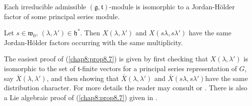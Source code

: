 \setcounter{prop}{5}
\begin{theorem}\label{chap8:thm8.6}
Each irreducible admissible $(\mathfrak{g}, \mathfrak{t})$-module is
isomorphic to a Jordan-H\"older factor of some principal series module.
\end{theorem}

\begin{prop}\label{chap8:prop8.7}
Let $s \in \mathfrak{w}_0$, $(\lambda, \lambda') \in
\mathfrak{h}^*$. Then $X(\lambda, \lambda')$ and $X(s\lambda,
s\lambda')$ have the same Jordan-H\"older factors occurring with the
same multiplicity.
\end{prop}

The easiest proof of (\ref{chap8:prop8.7}) is given by first checking that
$X(\lambda,\lambda')$ is isomorphic to the set of
$\mathfrak{t}$-finite vectors for a principal series representation of
$G$, say $\bar{X}(\lambda,\lambda')$, and then showing that
$\bar{X}(\lambda, \lambda')$ and $\bar{X}(s\lambda,
s\lambda')$\pageoriginale have the same distribution character. For
more details the reader may consult \cite{key31} or
\cite{key32}. There is also a Lie algebraic proof of
(\ref{chap8:prop8.7}) given in \cite{key28}. 
